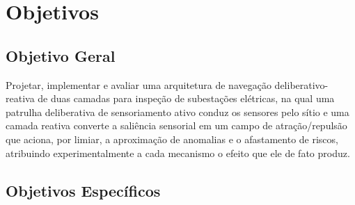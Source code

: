 

\section{Objetivos}

\subsection{Objetivo Geral}

Projetar, implementar e avaliar uma arquitetura de navegação deliberativo-reativa de
duas camadas para inspeção de subestações elétricas, na qual uma patrulha
deliberativa de sensoriamento ativo conduz os sensores pelo sítio e uma camada
reativa converte a saliência sensorial em um campo de atração/repulsão que aciona,
por limiar, a aproximação de anomalias e o afastamento de riscos, atribuindo
experimentalmente a cada mecanismo o efeito que ele de fato produz.

\subsection{Objetivos Específicos}

